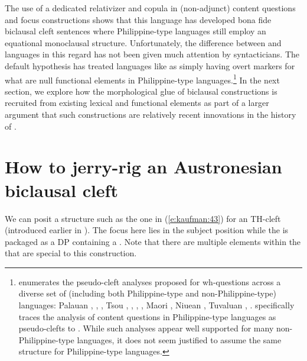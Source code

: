 \documentclass[output=paper]{langsci/langscibook}
\begin{document}
\noindent
The use of a dedicated relativizer and copula in  (non-adjunct) content questions and focus constructions shows that this language has developed bona fide biclausal cleft sentences where Philippine-type languages still employ an equational monoclausal structure. Unfortunately, the difference between  and   languages in this regard has not been given much attention by syntacticians. The default hypothesis has treated languages like  as simply having overt markers for what are null functional elements in Philippine-type languages.\footnote{\citet{Potsdam:2009} enumerates the pseudo-cleft analyses proposed for wh-questions across a diverse set of  (including both Philippine-type and non-Philippine-type) languages: Palauan \citep{Georgopoulos:1991a},  \citep{Cole:2014},  \citep{Cole:2005b}, Tsou \citep{Chang:2000},  \citep{Kroeger:1993, Richards:1998a, Aldridge:2004, Aldridge:2002},  \citep{Aldridge:2004, Aldridge:2002},  \citep{Paul:2001, Paul:2000a, Potsdam:2006, Potsdam:2006a}, Maori  \citep{Bauer:1991, Bauer:1993}, Niuean \citep{Seiter:1980}, Tuvaluan \citep{Besnier:2000},  \citep{Otsuka:2000, Custis:2004}. \citet{Chung:2010} specifically traces the analysis of content questions in Philippine-type languages as pseudo-clefts to \citet{Seiter:1975}. While such analyses appear well supported for many non-Philippine-type languages, it does not seem justified to assume the same structure for Philippine-type languages.} In the next section, we explore how the morphological glue of biclausal constructions is recruited from existing lexical and functional elements as part of a larger argument that such constructions are relatively recent innovations in the history of . 

\section{\label{s:kaufman:4}How to jerry-rig an Austronesian biclausal cleft}

We can posit a structure such as the one in (\ref{e:kaufman:43}) for an  TH-cleft (introduced earlier in ). The focus here lies in the subject position while the  is packaged as a DP containing a . Note that there are multiple elements within the  that are special to this construction. 
\end{document}
